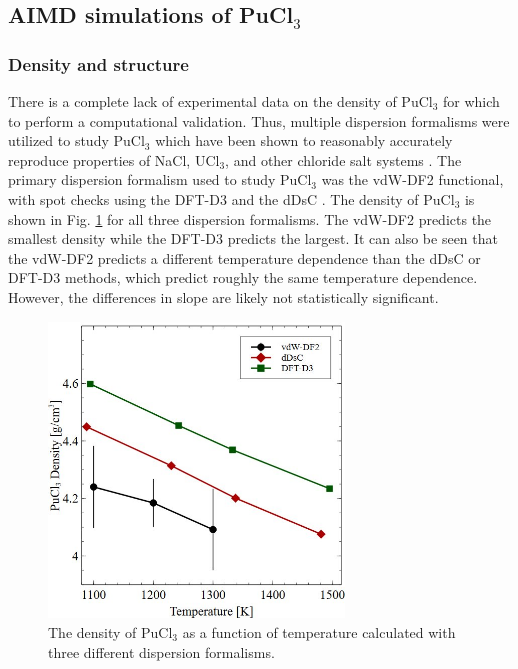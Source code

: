 \documentclass[review]{elsarticle}
\begin{document}
\subsection{AIMD simulations of PuCl$_3$}
\subsubsection{Density and structure}
There is a complete lack of experimental data on the density of PuCl$_3$ for which to perform a computational validation. Thus, multiple dispersion formalisms were utilized to study PuCl$_3$ which have been shown to reasonably accurately reproduce properties of NaCl, UCl$_3$, and other chloride salt systems \cite{duemmler_liclkcl,duemmler_naclmgcl, ANDERSSON2022153836}. The primary dispersion formalism used to study PuCl$_3$ was the vdW-DF2 functional, with spot checks using the DFT-D3\cite{Grimme2010,grimme2011effect} and the dDsC \cite{steinmann2011comprehensive, steinmann2011generalized}. The density of PuCl$_3$ is shown in Fig. \ref{fig:pucl3_density} for all three dispersion formalisms. The vdW-DF2 predicts the smallest density while the DFT-D3 predicts the largest. It can also be seen that the vdW-DF2 predicts a different temperature dependence than the dDsC or DFT-D3 methods, which predict roughly the same temperature dependence. However, the differences in slope are likely not statistically significant. 

\begin{figure}[h!]
 \centering
 \includegraphics[width=0.7\textwidth]{PuCl-density.jpg} 
 \caption{The density of PuCl$_3$ as a function of temperature calculated with three different dispersion formalisms.}
 \label{fig:pucl3_density}
\end{figure}
\end{document}
